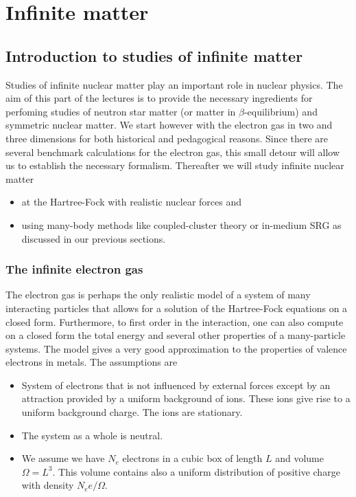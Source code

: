 \documentclass[graybox,sectrefs,envcountresetchap,open=right]{svmonodo}
\begin{document}
\chapter{Infinite matter}
\label{ch:infmatter}


\section{Introduction to studies of infinite matter}


Studies of infinite nuclear matter play an important role  in nuclear physics. The aim of this part of the lectures is to provide the necessary ingredients for perfoming studies of neutron star matter (or matter in $\beta$-equilibrium) and symmetric nuclear matter. We start however with the electron gas in two and three dimensions for both historical and pedagogical reasons. Since there are several benchmark calculations for the electron gas, this small detour will allow us to establish the necessary formalism. Thereafter we will study infinite nuclear matter 
\begin{itemize}
\item at the Hartree-Fock with realistic nuclear forces and

\item using many-body methods like coupled-cluster theory or in-medium SRG as discussed in our previous sections.
\end{itemize}

\noindent
\subsection{The infinite electron gas}

The electron gas is perhaps the only realistic model of a 
system of many interacting particles that allows for a solution
of the Hartree-Fock equations on a closed form. Furthermore, to first order in the interaction, one can also
compute on a closed form the total energy and several other properties of a many-particle systems. 
The model gives a very good approximation to the properties of valence electrons in metals.
The assumptions are

\begin{itemize}
 \item System of electrons that is not influenced by external forces except by an attraction provided by a uniform background of ions. These ions give rise to a uniform background charge. The ions are stationary.

 \item The system as a whole is neutral.

 \item We assume we have $N_e$ electrons in a cubic box of length $L$ and volume $\Omega=L^3$. This volume contains also a uniform distribution of positive charge with density $N_ee/\Omega$. 
\end{itemize}
\end{document}
